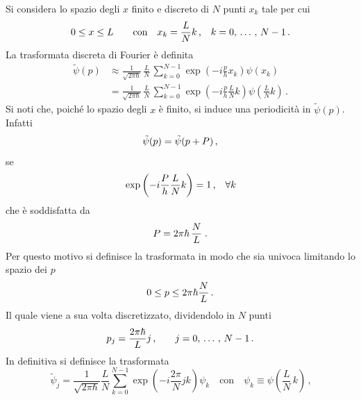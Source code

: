 \documentclass[12pt]{report}
\begin{document}
Si considera lo spazio degli $x$ finito e discreto di $N$ punti $x_{k}$ tale per cui 
\begin{equation}
    \centering
    0 \le x \le L \qquad \text{con} \quad x_{k} = \frac{L}{N}  k \, \text{,} \quad  k = 0, \, \dots\, , \,  N-1 \, \text{.}
    \label{eq:x_space}
\end{equation}
La trasformata discreta di Fourier è definita
\begin{equation}
    \begin{split}
        \tilde{\psi}(p) & \approx \frac{1}{\sqrt{2 \pi \hbar}} \, \frac{L}{N} \, \sum_{k=0}^{N-1}  \exp \left(-i \frac{p}{h} x_{k} \right) \psi(x_{k}) \\
        & = \frac{1}{\sqrt{2 \pi \hbar}} \, \frac{L}{N} \, \sum_{k=0}^{N-1}  \exp \left(-i \frac{p}{h} \frac{L}{N} k \right) \psi ( \frac{L}{N} k ) \, \text{.}
    \end{split}
    \label{eq:dft}
\end{equation}
Si noti che, poiché lo spazio degli $x$ è finito, si induce una periodicità in $\tilde{\psi}(p)$. Infatti
\begin{equation}
    \centering
    \tilde{\psi}(p) = \tilde{\psi}(p + P) \, \text{,}
    \label{eq:p_periodicity}
\end{equation}
se 
\begin{equation}
    \centering
    \exp \left(-i \frac{P}{h} \frac{L}{N} k \right) = 1 \, \text{,} \quad \forall k
\end{equation}
che è soddisfatta da 
\begin{equation}
    \centering
    P = 2 \pi \hbar \, \frac{N}{L} \; \text{.}
    \end{equation}
Per questo motivo si definisce la trasformata in modo che sia univoca limitando lo spazio dei $p$
\begin{equation}
    \centering
    0 \le p \le 2 \pi \hbar \frac{N}{L} \, \text{.}
    \label{eq:p_space}
\end{equation}
Il quale viene a sua volta discretizzato, dividendolo in $N$ punti 
\begin{equation}
    \centering
    p_{j} = \frac{2 \pi \hbar}{L} j \, \text{,} \qquad  j = 0, \, \dots\,,\, N-1 \, \text{.}
\end{equation}
In definitiva si definisce la trasformata
\begin{equation}
    \tilde{\psi}_j = \frac{1}{\sqrt{2 \pi \hbar}} \frac{L}{N} \sum_{k=0}^{N-1}  \exp \left(-i \frac{2 \pi}{N} j k\right) \psi_k \quad \text{con}  \quad \psi_k \equiv \psi \left( \frac{L}{N} \, k \right) \, \text{,}
    \label{eq:dft_final}
\end{equation}
\end{document}

